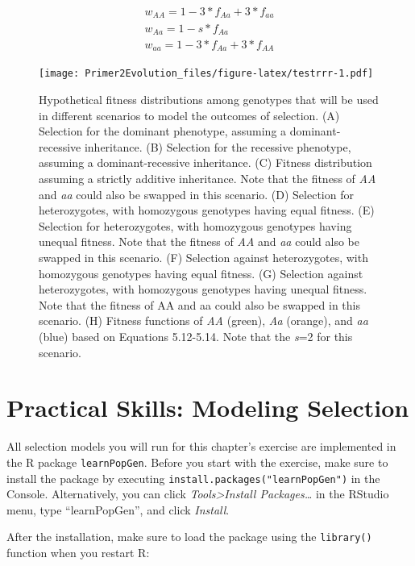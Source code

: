 \documentclass[
]{book}
\begin{document}
\begin{align}
w_{AA}=1-3*f_{Aa}+3*f_{aa} \label{eq:19}\\
w_{Aa}=1-s*f_{Aa} \label{eq:20}\\
w_{aa}=1-3*f_{Aa}+3*f_{AA} \label{eq:21}
\end{align}

\begin{figure}
\centering
\texttt{[image: Primer2Evolution\_files/figure-latex/testrrr-1.pdf]}
\caption{\label{fig:testrrr}Hypothetical fitness distributions among genotypes that will be used in different scenarios to model the outcomes of selection. (A) Selection for the dominant phenotype, assuming a dominant-recessive inheritance. (B) Selection for the recessive phenotype, assuming a dominant-recessive inheritance. (C) Fitness distribution assuming a strictly additive inheritance. Note that the fitness of \emph{AA} and \emph{aa} could also be swapped in this scenario. (D) Selection for heterozygotes, with homozygous genotypes having equal fitness. (E) Selection for heterozygotes, with homozygous genotypes having unequal fitness. Note that the fitness of \emph{AA} and \emph{aa} could also be swapped in this scenario. (F) Selection against heterozygotes, with homozygous genotypes having equal fitness. (G) Selection against heterozygotes, with homozygous genotypes having unequal fitness. Note that the fitness of AA and aa could also be swapped in this scenario. (H) Fitness functions of \emph{AA} (green), \emph{Aa} (orange), and \emph{aa} (blue) based on Equations 5.12-5.14. Note that the \emph{s}=2 for this scenario.}
\end{figure}

\hypertarget{practical-skills}{%
\section{Practical Skills: Modeling Selection}\label{practical-skills}}

All selection models you will run for this chapter's exercise are implemented in the R package \texttt{learnPopGen}. Before you start with the exercise, make sure to install the package by executing \texttt{install.packages("learnPopGen")} in the Console. Alternatively, you can click \emph{Tools\textgreater Install Packages\ldots{}} in the RStudio menu, type ``learnPopGen'', and click \emph{Install}.

After the installation, make sure to load the package using the \texttt{library()} function when you restart R:
\end{document}
